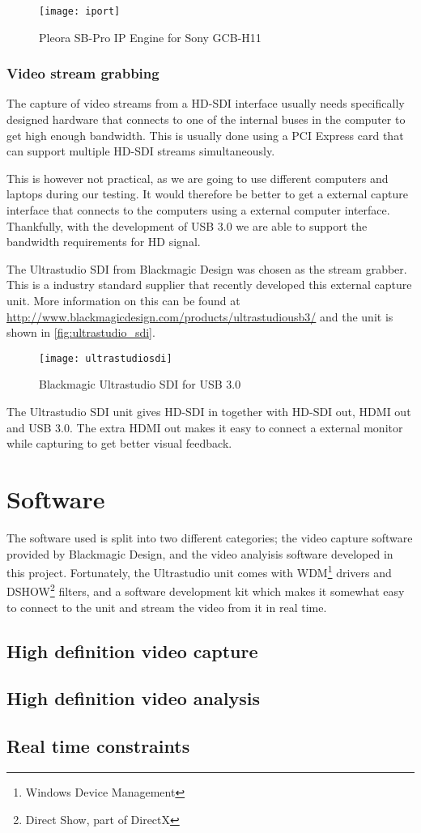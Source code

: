 \begin{figure}[htbp]
	\centering
	\texttt{[image: iport]}
	\caption{Pleora SB-Pro IP Engine for Sony GCB-H11}
	\label{fig:iport}
\end{figure}

\subsubsection{Video stream grabbing}
The capture of video streams from a HD-SDI interface usually needs specifically designed hardware that 
connects to one of the internal buses in the computer to get high enough bandwidth. This is usually 
done using a PCI Express card that can support multiple HD-SDI streams simultaneously. 

This is 
however not practical, as we are going to use different computers and laptops during our testing. 
It would therefore be better to get a external capture interface that connects to the computers using a 
external computer interface. Thankfully, with the development of USB 3.0 we are able 
to support the bandwidth requirements for HD signal.

The Ultrastudio SDI from Blackmagic Design was chosen as the stream grabber. This is a industry standard 
supplier that recently developed this external capture unit. More information on this can be found at 
\url{http://www.blackmagicdesign.com/products/ultrastudiousb3/} and the unit is shown in \vref{fig:ultrastudio_sdi}.

\begin{figure}[htbp]
	\centering
	\texttt{[image: ultrastudiosdi]}
	\caption{Blackmagic Ultrastudio SDI for USB 3.0}
	\label{fig:ultrastudio_sdi}
\end{figure}

The Ultrastudio SDI unit gives HD-SDI in together with HD-SDI out, HDMI out and USB 3.0. The 
extra HDMI out makes it easy to connect a external monitor while capturing to get better visual feedback.



\section{Software}
The software used is split into two different categories; the video capture software provided by Blackmagic 
Design, and the video analyisis software developed in this project. Fortunately, the Ultrastudio 
unit comes with WDM\footnote{Windows Device Management} drivers and DSHOW\footnote{Direct Show, part of DirectX} 
filters, and a software development kit which makes it somewhat easy to connect to the unit and stream 
the video from it in real time. 


\subsection{High definition video capture}

\subsection{High definition video analysis}

\subsection{Real time constraints}

